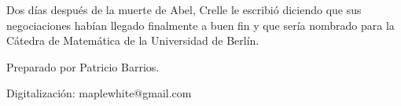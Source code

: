 \documentclass[a4paper, 12pt, draft]{article}
\begin{document}
Dos días después de la muerte de Abel, Crelle le escribió diciendo que sus negociaciones habían llegado finalmente a buen fin y que sería nombrado para la Cátedra de Matemática de la Universidad de Berlín. 


\bigskip
\begin{flushright}
Preparado por Patricio Barrios.

Digitalización: maplewhite@gmail.com
\end{flushright}
\end{document}
